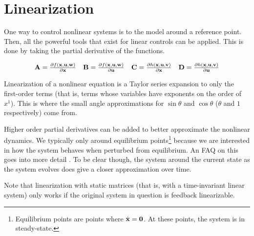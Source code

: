 \section{Linearization}

One way to control nonlinear \glspl{system} is to
 the \gls{model} around a reference point.
Then, all the powerful tools that exist for linear controls can be applied. This
is done by taking the partial derivative of the functions.

\begin{align*}
  \begin{array}{cccc}
    \mathbf{A} = \frac{\partial f(\mathbf{x}, \mathbf{u}, \mathbf{w})}{\partial \mathbf{x}} &
    \mathbf{B} = \frac{\partial f(\mathbf{x}, \mathbf{u}, \mathbf{w})}{\partial \mathbf{u}} &
    \mathbf{C} = \frac{\partial h(\mathbf{x}, \mathbf{u}, \mathbf{v})}{\partial \mathbf{x}} &
    \mathbf{D} = \frac{\partial h(\mathbf{x}, \mathbf{u}, \mathbf{v})}{\partial \mathbf{u}}
  \end{array}
\end{align*}

Linearization of a nonlinear equation is a Taylor series expansion to only the
first-order terms (that is, terms whose variables have exponents on the order of
$x^1$). This is where the small angle approximations for $\sin\theta$ and
$\cos\theta$ ($\theta$ and $1$ respectively) come from.

Higher order partial derivatives can be added to better approximate the
nonlinear dynamics. We typically only  around
equilibrium points\footnote{Equilibrium points are points where
$\dot{\mathbf{x}} = \mathbf{0}$. At these points, the system is in steady-state.}
because we are interested in how the \gls{system} behaves when perturbed from
equilibrium. An FAQ on this goes into more detail
\cite{bib:linearize_equilibrium_point}. To be clear though,
 the \gls{system} around the current
\gls{state} as the \gls{system} evolves does give a closer approximation over
time.

Note that linearization with static matrices (that is, with a time-invariant
linear \gls{system}) only works if the original \gls{system} in question is
feedback linearizable.

